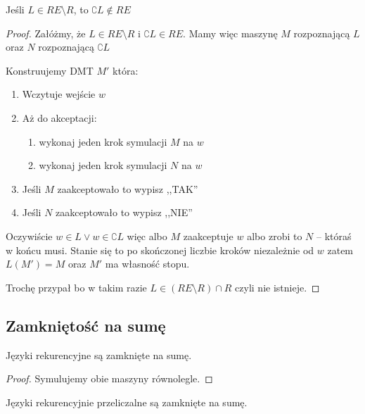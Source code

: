 \begin{theorem}
	Jeśli \( L \in RE \setminus R \), to \( \complement{L} \not \in RE\)
\end{theorem}
\begin{proof}
	Załóżmy, że \( L \in RE \setminus R \) i \( \complement{L} \in RE\).
	Mamy więc maszynę \( M \) rozpoznającą \( L \) oraz \( N \) rozpoznającą \( \complement{L} \)

	Konstruujemy DMT \( M' \) która:
	\begin{enumerate}
		\item Wczytuje wejście \( w \)
		\item Aż do akceptacji:
		      \begin{enumerate}
			      \item wykonaj jeden krok symulacji \( M \) na \( w \)
			      \item wykonaj jeden krok symulacji \( N \) na \( w \)
		      \end{enumerate}
		\item Jeśli \( M \) zaakceptowało to wypisz ,,TAK''
		\item Jeśli \( N \) zaakceptowało to wypisz ,,NIE''
	\end{enumerate}

	Oczywiście \( w \in L \lor w \in \complement{L} \) więc albo \( M \) zaakceptuje \( w \) albo zrobi to \( N \) -- któraś w końcu musi.
	Stanie się to po skończonej liczbie kroków niezależnie od \( w \) zatem \( L(M') = M \) oraz \( M' \) ma własność stopu.

	Trochę przypał bo w takim razie \( L \in (RE \setminus R) \cap R \) czyli nie istnieje.

\end{proof}

\subsection{Zamkniętość na sumę}

\begin{theorem}
	Języki rekurencyjne są zamknięte na sumę.
\end{theorem}

\begin{proof}
	Symulujemy obie maszyny równolegle.
\end{proof}

\begin{theorem}
	Języki rekurencyjnie przeliczalne są zamknięte na sumę.
\end{theorem}

